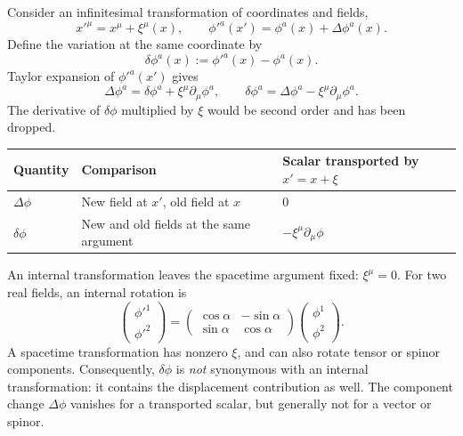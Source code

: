 \documentclass[11pt]{article}
\begin{document}
Consider an infinitesimal transformation of coordinates and fields,
\begin{equation}
x'^\mu=x^\mu+\xi^\mu(x),\qquad
\phi'^a(x')=\phi^a(x)+\Delta\phi^a(x).
\end{equation}
Define the variation at the same coordinate by
\begin{equation}
\delta\phi^a(x):=\phi'^a(x)-\phi^a(x).
\end{equation}
Taylor expansion of \(\phi'^a(x')\) gives
\begin{equation}
\boxed{\Delta\phi^a=\delta\phi^a+\xi^\mu\partial_\mu\phi^a,
\qquad \delta\phi^a=\Delta\phi^a-\xi^\mu\partial_\mu\phi^a.}
\label{eq:twoVariations}
\end{equation}
The derivative of \(\delta\phi\) multiplied by \(\xi\) would be second
order and has been dropped.

\begin{center}
\small
\begin{tabular}{@{}p{}p{}p{}@{}}
\toprule
Quantity & Comparison & Scalar transported by \(x'=x+\xi\) \\
\midrule
\(\Delta\phi\) & New field at \(x'\), old field at \(x\) & \(0\) \\
\(\delta\phi\) & New and old fields at the same argument &
\(-\xi^\mu\partial_\mu\phi\) \\
\bottomrule
\end{tabular}
\end{center}

An internal transformation leaves the spacetime argument fixed:
\(\xi^\mu=0\). For two real fields, an internal rotation is
\begin{equation}
\begin{pmatrix}\phi'^1\\\phi'^2\end{pmatrix}
=\begin{pmatrix}\cos\alpha&-\sin\alpha\\\sin\alpha&\cos\alpha\end{pmatrix}
\begin{pmatrix}\phi^1\\\phi^2\end{pmatrix}.
\end{equation}
A spacetime transformation has nonzero \(\xi\), and can also rotate tensor
or spinor components. Consequently, \(\delta\phi\) is \emph{not} synonymous
with an internal transformation: it contains the displacement contribution
as well. The component change \(\Delta\phi\) vanishes for a transported
scalar, but generally not for a vector or spinor.
\end{document}
